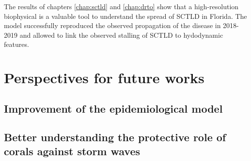 The results of chapters \ref{chap:sctld} and \ref{chap:drto} show that a high-resolution biophysical is a valuable tool to understand the spread of SCTLD in Florida. The model successfully reproduced the observed propagation of the disease in 2018-2019 and allowed to link the observed stalling of SCTLD to hydodynamic features. 

\section{Perspectives for future works}

\subsection*{Improvement of the epidemiological model}


\subsection*{Better understanding the protective role of corals against storm waves}
